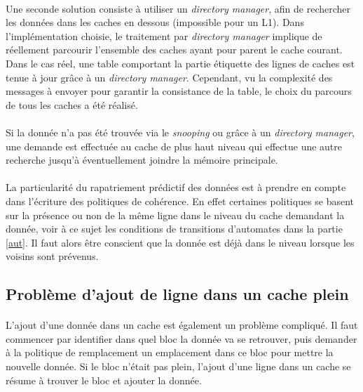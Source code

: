 \paragraph{}
\label{directorymanager}
Une seconde solution consiste à utiliser un \emph{directory manager}, afin de rechercher les données dans les caches en dessous (impossible pour un L1). Dans l'implémentation choisie, le traitement par \emph{directory manager} implique de réellement parcourir l'ensemble des caches ayant pour parent le cache courant. Dans le cas réel, une table comportant la partie étiquette des lignes de caches est tenue à jour grâce à un \emph{directory manager}. Cependant, vu la complexité des messages à envoyer pour garantir la consistance de la table, le choix du parcours de tous les caches a été réalisé.

\paragraph{}
Si la donnée n'a pas été trouvée via le \emph{snooping} ou grâce à un \emph{directory manager}, une demande est effectuée au cache de plus haut niveau qui effectue une autre recherche jusqu'à éventuellement joindre la mémoire principale.

\paragraph{}
La particularité du rapatriement prédictif des données est à prendre en compte dans l'écriture des politiques de cohérence. En effet certaines politiques se basent sur la présence ou non de la même ligne dans le niveau du cache demandant la donnée, voir à ce sujet les conditions de transitions d'automates dans la partie \ref{aut}. Il faut alors être conscient que la donnée est déjà dans le niveau lorsque les voisins sont prévenus.

\subsection{Problème d'ajout de ligne dans un cache plein}

\paragraph{}
L'ajout d'une donnée dans un cache est également un problème compliqué. Il faut commencer par identifier dans quel bloc la donnée va se retrouver, puis demander à la politique de remplacement un emplacement dans ce bloc pour mettre la nouvelle donnée. Si le bloc n'était pas plein, l'ajout d'une ligne dans un cache se résume à trouver le bloc et ajouter la donnée.


